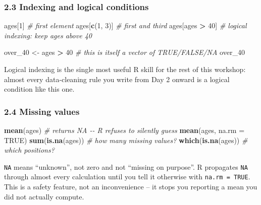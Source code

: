 \documentclass[11pt]{article}
\newenvironment{Shaded}{\begin{snugshade}}{\end{snugshade}}
\newcommand{\AttributeTok}[1]{\textcolor[rgb]{0.13,0.29,0.53}{#1}}
\newcommand{\CommentTok}[1]{\textcolor[rgb]{0.56,0.35,0.01}{\textit{#1}}}
\newcommand{\ConstantTok}[1]{\textcolor[rgb]{0.56,0.35,0.01}{#1}}
\newcommand{\DecValTok}[1]{\textcolor[rgb]{0.00,0.00,0.81}{#1}}
\newcommand{\FunctionTok}[1]{\textcolor[rgb]{0.13,0.29,0.53}{\textbf{#1}}}
\newcommand{\NormalTok}[1]{#1}
\newcommand{\OtherTok}[1]{\textcolor[rgb]{0.56,0.35,0.01}{#1}}
\newcommand{\SpecialCharTok}[1]{\textcolor[rgb]{0.81,0.36,0.00}{\textbf{#1}}}
\begin{document}
\hypertarget{indexing-and-logical-conditions}{%
\subsubsection{2.3 Indexing and logical
conditions}\label{indexing-and-logical-conditions}}

\begin{Shaded}
\begin{Highlighting}[]
\NormalTok{ages[}\DecValTok{1}\NormalTok{]              }\CommentTok{\# first element}
\NormalTok{ages[}\FunctionTok{c}\NormalTok{(}\DecValTok{1}\NormalTok{, }\DecValTok{3}\NormalTok{)]        }\CommentTok{\# first and third}
\NormalTok{ages[ages }\SpecialCharTok{\textgreater{}} \DecValTok{40}\NormalTok{]      }\CommentTok{\# logical indexing: keep ages above 40}

\NormalTok{over\_40 }\OtherTok{\textless{}{-}}\NormalTok{ ages }\SpecialCharTok{\textgreater{}} \DecValTok{40} \CommentTok{\# this is itself a vector of TRUE/FALSE/NA}
\NormalTok{over\_40}
\end{Highlighting}
\end{Shaded}

Logical indexing is the single most useful R skill for the rest of this
workshop: almost every data-cleaning rule you write from Day 2 onward is
a logical condition like this one.

\hypertarget{missing-values}{%
\subsubsection{2.4 Missing values}\label{missing-values}}

\begin{Shaded}
\begin{Highlighting}[]
\FunctionTok{mean}\NormalTok{(ages)            }\CommentTok{\# returns NA {-}{-} R refuses to silently guess}
\FunctionTok{mean}\NormalTok{(ages, }\AttributeTok{na.rm =} \ConstantTok{TRUE}\NormalTok{)}
\FunctionTok{sum}\NormalTok{(}\FunctionTok{is.na}\NormalTok{(ages))      }\CommentTok{\# how many missing values?}
\FunctionTok{which}\NormalTok{(}\FunctionTok{is.na}\NormalTok{(ages))    }\CommentTok{\# which positions?}
\end{Highlighting}
\end{Shaded}

\texttt{NA} means ``unknown'', not zero and not ``missing on purpose''.
R propagates \texttt{NA} through almost every calculation until you tell
it otherwise with \texttt{na.rm\ =\ TRUE}. This is a safety feature, not
an inconvenience -- it stops you reporting a mean you did not actually
compute.
\end{document}
